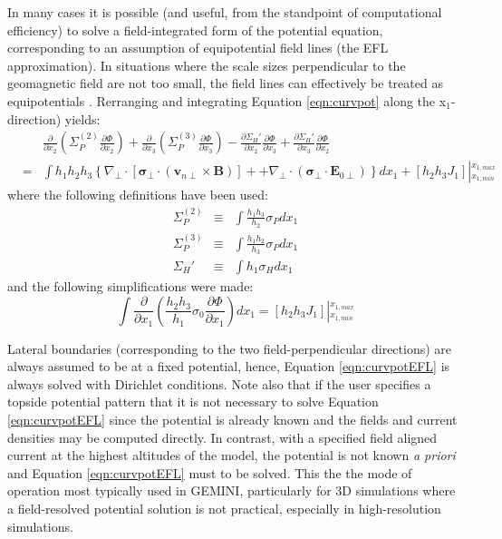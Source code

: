 \documentclass[11pt,letterpaper]{article}
\begin{document}
In many cases it is possible (and useful, from the standpoint of computational efficiency) to solve a field-integrated form of the potential equation, corresponding to an assumption of equipotential field lines (the EFL approximation).  In situations where the scale sizes perpendicular to the geomagnetic field are not too small, the field lines can effectively be treated as equipotentials \citep{Farley:1959,Huba:1988}.  Rerranging and integrating Equation \ref{eqn:curvpot} along the x$_1$-direction) yields:
\begin{eqnarray}
&~& \frac{\partial}{\partial x_2} \left( \Sigma_P^{(2)} \frac{\partial \Phi}{\partial x_2} \right) + \frac{\partial}{\partial x_3} \left( \Sigma_P^{(3)} \frac{\partial \Phi}{\partial x_3} \right) -  \frac{\partial \Sigma_H'}{\partial x_2} \frac{\partial \Phi}{\partial x_3} + \frac{\partial \Sigma_H'}{\partial x_3} \frac{\partial \Phi}{\partial x_2} \nonumber \\ &=& \int h_1 h_2 h_3 \left\{ \nabla_\perp \cdot \left[ \boldsymbol{\sigma}_\perp \cdot \left( \mathbf{v}_{n\perp} \times \mathbf{B} \right) \right] + + \nabla_\perp \cdot \left( \boldsymbol{\sigma}_\perp \cdot \mathbf{E}_{0\perp} \right) \right\} d x_1 + \left[ h_2 h_3 J_1 \right] \left|^{x_{1,max}}_{x_{1,min}} \right. \label{eqn:curvpotEFL}
\end{eqnarray}
where the following definitions have been used:
\begin{eqnarray}
\Sigma_P^{(2)} &\equiv& \int \frac{h_1 h_3}{h_2} \sigma_P dx_1 \\
\Sigma_P^{(3)} &\equiv& \int \frac{h_1 h_2}{h_3} \sigma_P dx_1 \\
\Sigma_H' &\equiv& \int h_1 \sigma_H dx_1 
\end{eqnarray}
and the following simplifications were made:
\begin{equation}
\int \frac{\partial}{\partial x_1} \left( \frac{h_2 h_3}{h_1} \sigma_0 \frac{\partial \Phi}{\partial x_1} \right) d x_1= \left[ h_2 h_3 J_1 \right] \left|^{x_{1,max}}_{x_{1,min}} \right.
\end{equation}

Lateral boundaries (corresponding to the two field-perpendicular directions) are always assumed to be at a fixed potential, hence, Equation \ref{eqn:curvpotEFL} is always solved with Dirichlet conditions.  Note also that if the user specifies a topside potential pattern that it is not necessary to solve Equation \ref{eqn:curvpotEFL} since the potential is already known and the fields and current densities may be computed directly.  In contrast, with a specified field aligned current at the highest altitudes of the model, the potential is not known \emph{a priori} and Equation \ref{eqn:curvpotEFL} must to be solved.  This the the mode of operation most typically used in GEMINI, particularly for 3D simulations where a field-resolved potential solution is not practical, especially in high-resolution simulations.  %
\end{document}
